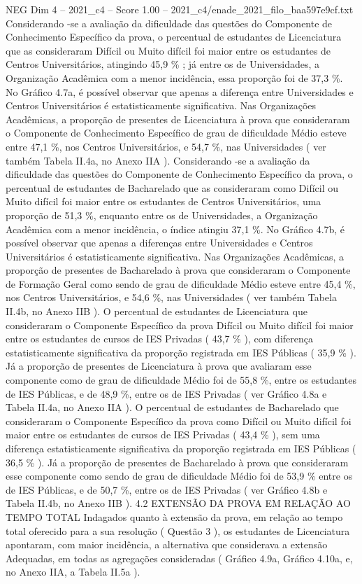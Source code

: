 \begin{textsample}{NEG Dim 4 – 2021\_c4 – Score 1.00 – 2021\_c4/enade\_2021\_filo\_baa597e9cf.txt}
Considerando -se a avaliação da dificuldade das questões do Componente de Conhecimento Específico da prova, o percentual de estudantes de Licenciatura que as consideraram Difícil ou Muito difícil foi maior entre os estudantes de Centros Universitários, atingindo 45,9 \% ; já entre os de Universidades, a Organização Acadêmica com a menor incidência, essa proporção foi de 37,3 \%.
No Gráfico 4.7a, é possível observar que apenas a diferença entre Universidades e Centros Universitários é estatisticamente significativa.
Nas Organizações Acadêmicas, a proporção de presentes de Licenciatura à prova que consideraram o Componente de Conhecimento Específico de grau de dificuldade Médio esteve entre 47,1 \%, nos Centros Universitários, e 54,7 \%, nas Universidades ( ver também Tabela II.4a, no Anexo IIA ).
Considerando -se a avaliação da dificuldade das questões do Componente de Conhecimento Específico da prova, o percentual de estudantes de Bacharelado que as consideraram como Difícil ou Muito difícil foi maior entre os estudantes de Centros Universitários, uma proporção de 51,3 \%, enquanto entre os de Universidades, a Organização Acadêmica com a menor incidência, o índice atingiu 37,1 \%.
No Gráfico 4.7b, é possível observar que apenas a diferenças entre Universidades e Centros Universitários é estatisticamente significativa.
Nas Organizações Acadêmicas, a proporção de presentes de Bacharelado à prova que consideraram o Componente de Formação Geral como sendo de grau de dificuldade Médio esteve entre 45,4 \%, nos Centros Universitários, e 54,6 \%, nas Universidades ( ver também Tabela II.4b, no Anexo IIB ).
O percentual de estudantes de Licenciatura que consideraram o Componente Específico da prova Difícil ou Muito difícil foi maior entre os estudantes de cursos de IES Privadas ( 43,7 \% ), com diferença estatisticamente significativa da proporção registrada em IES Públicas ( 35,9 \% ).
Já a proporção de presentes de Licenciatura à prova que avaliaram esse componente como de grau de dificuldade Médio foi de 55,8 \%, entre os estudantes de IES Públicas, e de 48,9 \%, entre os de IES Privadas ( ver Gráfico 4.8a e Tabela II.4a, no Anexo IIA ).
O percentual de estudantes de Bacharelado que consideraram o Componente Específico da prova como Difícil ou Muito difícil foi maior entre os estudantes de cursos de IES Privadas ( 43,4 \% ), sem uma diferença estatisticamente significativa da proporção registrada em IES Públicas ( 36,5 \% ).
Já a proporção de presentes de Bacharelado à prova que consideraram esse componente como sendo de grau de dificuldade Médio foi de 53,9 \% entre os de IES Públicas, e de 50,7 \%, entre os de IES Privadas ( ver Gráfico 4.8b e Tabela II.4b, no Anexo IIB ). 4.2 EXTENSÃO DA PROVA EM RELAÇÃO AO TEMPO TOTAL Indagados quanto à extensão da prova, em relação ao tempo total oferecido para a sua resolução ( Questão 3 ), os estudantes de Licenciatura apontaram, com maior incidência, a alternativa que considerava a extensão Adequadas, em todas as agregações consideradas ( Gráfico 4.9a, Gráfico 4.10a, e, no Anexo IIA, a Tabela II.5a ).

\end{textsample}
